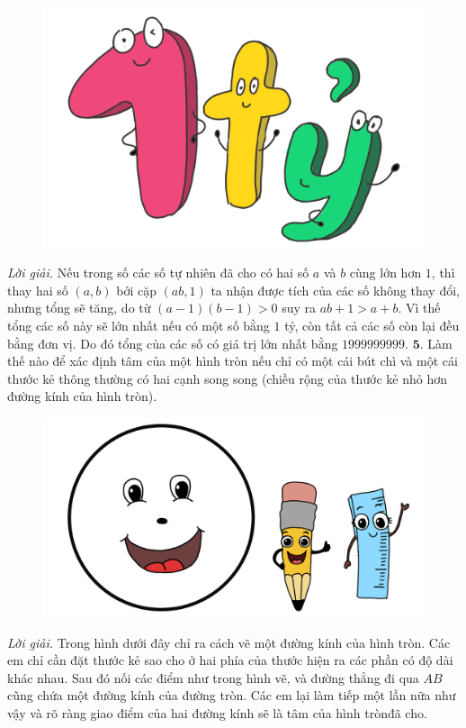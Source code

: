 \begin{multicols}{2}
\begin{figure}[H]
		\includegraphics[width=1\linewidth]{bai5}
		\vspace*{-5pt}
	\end{figure}
	\textit{Lời giải.} 	Nếu trong số các số tự nhiên đã cho có hai số $a$ và $b$ cùng lớn hơn $1$, thì thay hai số $(a,b)$ bởi cặp $(ab,1)$ ta nhận được tích của các số không thay đổi, nhưng tổng  sẽ tăng, do từ $(a-1)(b-1) >0$ suy ra $ab+1 > a+b$. Vì thế tổng các số này sẽ lớn nhất nếu có một số bằng $1$ tỷ, còn tất cả các số còn lại đều bằng đơn vị. Do đó tổng của các số có giá trị lớn nhất bằng $1 999 999 999$.
	\vskip 0.1cm
	$\pmb{5.}$ Làm thế nào để xác định tâm của một hình tròn nếu chỉ có một cái bút chì và một cái thước kẻ thông thường có hai cạnh song song (chiều rộng của thước kẻ nhỏ hơn đường kính của hình tròn).
	\begin{figure}[H]
		\centering
		\vspace*{-5pt}
		\captionsetup{labelformat= empty, justification=centering}
		\includegraphics[width=1\linewidth]{bai4}
		\vspace*{-15pt}
	\end{figure}
	\textit{Lời giải.} Trong hình dưới đây chỉ ra cách vẽ một đường kính của hình tròn. Các em chỉ cần đặt thước kẻ sao cho ở hai phía của thước hiện ra các phần có độ dài khác nhau. Sau đó nối các điểm như trong hình vẽ, và đường thẳng đi qua $AB$ cũng chứa một đường kính của đường tròn. Các em lại làm tiếp một lần nữa như vậy và rõ ràng giao điểm của hai đường kính sẽ là tâm của hình tròn\linebreak đã cho.

\end{multicols}
